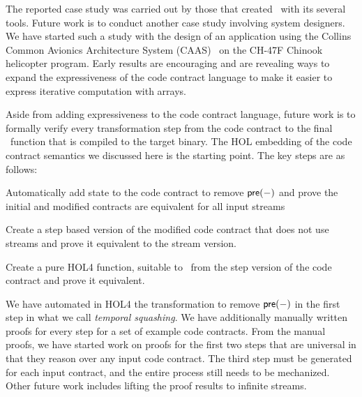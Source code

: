 The reported case study was carried out by those that created \brfcs\ with its several tools. 
Future work is to conduct another case study involving system designers.
We have started such a study with the design of
an application using the Collins Common Avionics Architecture System
(CAAS)~\cite{caas} on the CH-47F Chinook helicopter program.
Early results are encouraging and are revealing ways to expand the expressiveness of the code contract language to make it easier to express iterative computation with arrays.

Aside from adding expressiveness to the code contract language, future work is to formally verify every transformation step from the code contract to the final \ckml\ function that is compiled to the target binary. 
The HOL embedding of the code contract semantics we discussed here is the starting point.
The key steps are as follows:
\begin{compactitem}
  \item Automatically add state to the code contract to remove $\mathsf{pre}(-)$ and prove the initial and modified contracts are equivalent for all input streams
  \item Create a step based version of the modified code contract that does not use streams and prove it equivalent to the stream version.
  \item Create a pure HOL4 function, suitable to \ckml\, from the step version of the code contract and prove it equivalent.
\end{compactitem}
We have automated in HOL4 the transformation to remove $\mathsf{pre}(-)$ in the first step in what we call \emph{temporal squashing}.
We have additionally manually written proofs for every step for a set of example code contracts.
From the manual proofs, we have started work on proofs for the first two steps that are universal in that they reason over any input code contract.
The third step must be generated for each input contract, and the entire process still needs to be mechanized.
Other future work includes lifting the proof results to infinite streams.
